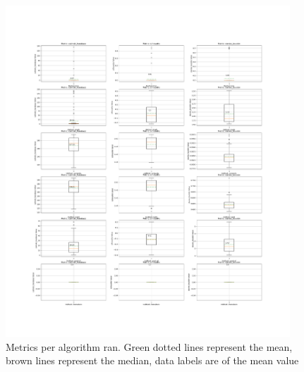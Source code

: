 \documentclass[12pt, a4paper]{article}
\begin{document}
                    \begin{figure}[H]
                        \begin{center}
                            \includegraphics[width=0.95\textwidth]{./testOutput/full_run_metrics.png}
                        \end{center}
                        \caption{Metrics per algorithm ran. Green dotted lines represent the mean, brown lines represent the median, data labels are of the mean value}\label{fig:res}
                    \end{figure}
\end{document}
